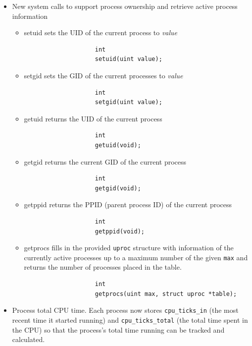 \documentclass[11pt,letterpaper]{report}
\begin{document}
	\begin{itemize}
	
	\item New system calls to support process ownership and retrieve active process information
	 	\begin{itemize}
			\item setuid sets the UID of the current process to \emph{value} 
				\begin{verbatim}
					int
					setuid(uint value);
				\end{verbatim}
				
			\item setgid sets the GID of the current processes to \emph{value} 
				\begin{verbatim}
					int
					setgid(uint value);
				\end{verbatim}
				
			\item getuid returns the UID of the current process
				\begin{verbatim}
					int
					getuid(void);
				\end{verbatim}
			
			\item getgid returns the current GID of the current process
				\begin{verbatim}
					int
					getgid(void);
				\end{verbatim}
			
			\item getppid returns the PPID (parent process ID) of the current process
				\begin{verbatim}
					int
					getppid(void);
				\end{verbatim}
				
			\item getprocs fills in the provided {\tt uproc} structure with information of the currently active processes
			         up to a maximum number of the given {\tt max} and returns the number of processes placed in the table.
			         \begin{verbatim}
					int
					getprocs(uint max, struct uproc *table);
				\end{verbatim}         

		 \end{itemize}
	
	\item Process total CPU time. Each process now stores {\tt cpu\_ticks\_in} (the most recent time it started running) and {\tt cpu\_ticks\_total} 
		(the total time spent in the CPU) so that the process's total time running can be tracked and calculated.
	

\end{itemize}
\end{document}
